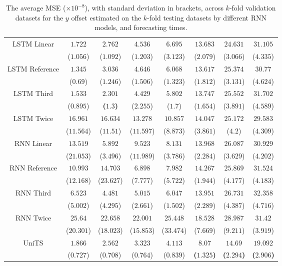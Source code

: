 \begin{table}[!ht]
{\begin{tabular}{|c|c|c|c|c|c|c|c|}
			\multirow{2}{*}{LSTM Linear} & $1.722$ & $2.762$ & $4.536$ & $6.695$ & $13.683$ & $24.631$ & $31.105$ \\
			 & ($1.056$) & ($1.092$) & ($1.203$) & ($3.123$) & ($2.079$) & ($3.066$) & ($4.335$) \\ \hline
			\multirow{2}{*}{LSTM Reference} & $1.345$ & $3.036$ & $4.646$ & $6.068$ & $13.617$ & $25.374$ & $30.77$ \\
			 & ($0.69$) & ($1.246$) & ($1.506$) & ($1.323$) & ($1.812$) & ($3.131$) & ($4.624$) \\ \hline
			\multirow{2}{*}{LSTM Third} & $1.533$ & $\mathbf{2.301}$ & $4.429$ & $5.802$ & $13.747$ & $25.552$ & $31.702$ \\
			 & ($0.895$) & \textbf{(}$\mathbf{1.3}$\textbf{)} & ($2.255$) & ($1.7$) & ($1.654$) & ($3.891$) & ($4.589$) \\ \hline
			\multirow{2}{*}{LSTM Twice} & $16.961$ & $16.634$ & $13.278$ & $10.857$ & $14.047$ & $25.172$ & $29.583$ \\
			 & ($11.564$) & ($11.51$) & ($11.597$) & ($8.873$) & ($3.861$) & ($4.2$) & ($4.309$) \\ \hline
			\multirow{2}{*}{RNN Linear} & $13.519$ & $5.892$ & $9.523$ & $8.131$ & $13.968$ & $26.087$ & $30.929$ \\
			 & ($21.053$) & ($3.496$) & ($11.989$) & ($3.786$) & ($2.284$) & ($3.629$) & ($4.202$) \\ \hline
			\multirow{2}{*}{RNN Reference} & $10.993$ & $14.703$ & $6.898$ & $7.982$ & $14.267$ & $25.869$ & $31.524$ \\
			 & ($12.168$) & ($23.627$) & ($7.777$) & ($5.722$) & ($1.944$) & ($4.177$) & ($4.183$) \\ \hline
			\multirow{2}{*}{RNN Third} & $6.523$ & $4.481$ & $5.015$ & $6.047$ & $13.951$ & $26.731$ & $32.358$ \\
			 & ($5.002$) & ($4.295$) & ($2.661$) & ($1.502$) & ($2.289$) & ($4.387$) & ($4.716$) \\ \hline
			\multirow{2}{*}{RNN Twice} & $25.64$ & $22.658$ & $22.001$ & $25.448$ & $18.528$ & $28.987$ & $31.42$ \\
			 & ($20.301$) & ($18.023$) & ($15.853$) & ($33.474$) & ($7.669$) & ($9.211$) & ($3.919$) \\ \hline
			\multirow{2}{*}{UniTS} & $1.866$ & $2.562$ & $3.323$ & $4.113$ & $\mathbf{8.07}$ & $\mathbf{14.69}$ & $\mathbf{19.092}$ \\
			 & ($0.727$) & ($0.708$) & ($0.764$) & ($0.839$) & \textbf{(}$\mathbf{1.325}$\textbf{)} & \textbf{(}$\mathbf{2.294}$\textbf{)} & \textbf{(}$\mathbf{2.906}$\textbf{)} \\ \hline
		\end{tabular}
	}
	\caption{The average MSE ($\times 10^{-8}$), with standard deviation in brackets, across $k$-fold validation datasets for the $y$ offset estimated on the $k$-fold testing datasets by different RNN models, and forecasting times.}
	\label{tab:all_latitude_no_abs_MSE}
\end{table}

